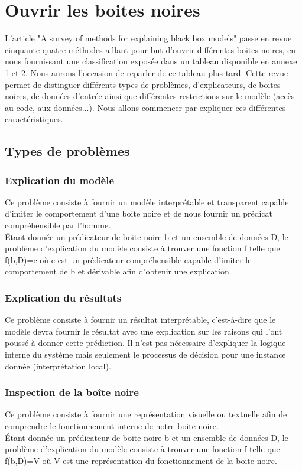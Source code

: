 \section{Ouvrir les boites noires}
L'article "A survey of methods for explaining black box models"\cite{surveyExplaining} passe en revue cinquante-quatre méthodes aillant pour but d'ouvrir différentes boites noires, en nous fournissant une classification exposée dans un tableau disponible en annexe 1 et 2. Nous aurons l'occasion de reparler de ce tableau plus tard. Cette revue permet de distinguer différents types de problèmes, d'explicateurs, de boites noires, de données d'entrée ainsi que différentes restrictions sur le modèle (accès au code, aux données...). Nous allons commencer par expliquer ces différentes caractéristiques.

\subsection{Types de problèmes}
\subsubsection{Explication du modèle}
Ce problème consiste à fournir un modèle interprétable et transparent capable d'imiter le comportement d'une boite noire et de nous fournir un prédicat compréhensible par l'homme.\\
Étant donnée un prédicateur de boite noire b et un ensemble de données D, le problème d'explication du modèle consiste à trouver une fonction f telle que f(b,D)=c où c est un prédicateur compréhensible capable d'imiter le comportement de b et dérivable afin d'obtenir une explication.

\subsubsection{Explication du résultats}
Ce problème consiste à fournir un résultat interprétable, c'est-à-dire que le modèle devra fournir le résultat avec une explication sur les raisons qui l'ont poussé à donner cette prédiction. Il n'est pas nécessaire d'expliquer la logique interne du système mais seulement le processus de décision pour une instance donnée (interprétation local).

\subsubsection{Inspection de la boîte noire}
Ce problème consiste à fournir une représentation visuelle ou textuelle afin de comprendre le fonctionnement interne de notre boite noire.\\
Étant donnée un prédicateur de boite noire b et un ensemble de données D, le problème d'explication du modèle consiste à trouver une fonction f telle que f(b,D)=V où V est une représentation du fonctionnement de la boite noire.

